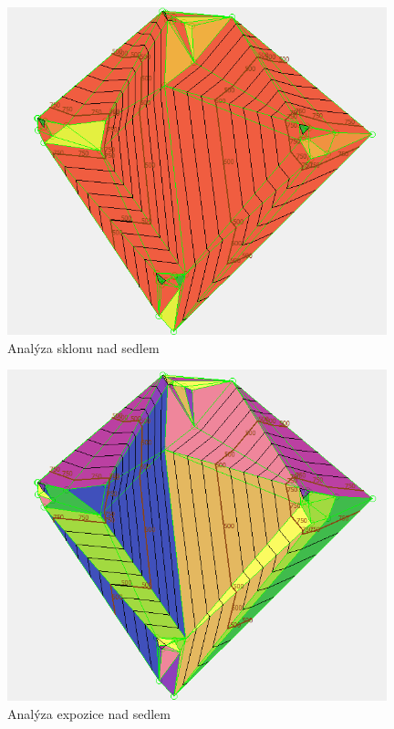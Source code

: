 \documentclass[a4paper,11pt,twoside]{article}
\begin{document}
\vspace{0.2cm}
\begin{figure}[hbt!] 
\begin{center}
\includegraphics[width=11cm]{pictures/saddle_slope.PNG} 
\caption[Analýza sklonu nad sedlem]{Analýza sklonu nad sedlem}
\label{fig:saddle_slope}
\end{center}
\end{figure}

\vspace{0.2cm}
\begin{figure}[hbt!] 
\begin{center}
\includegraphics[width=11cm]{pictures/saddle_aspect.PNG} 
\caption[Analýza expozice nad sedlem]{Analýza expozice nad sedlem}
\label{fig:saddle_aspect}
\end{center}
\end{figure}
\end{document}
